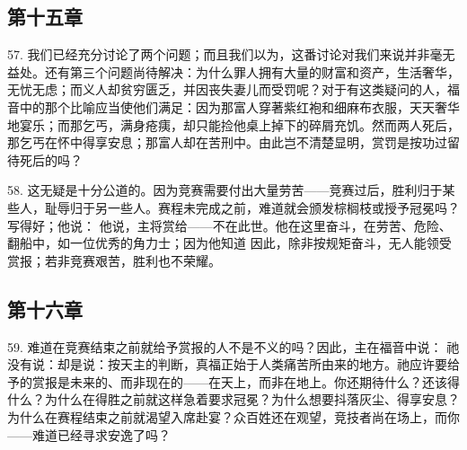 
\subsection{第十五章}

\par

57. 我们已经充分讨论了两个问题；而且我们以为，这番讨论对我们来说并非毫无益处。还有第三个问题尚待解决：为什么罪人拥有大量的财富和资产，生活奢华，无忧无虑；而义人却贫穷匮乏，并因丧失妻儿而受罚呢？对于有这类疑问的人，福音中的那个比喻应当使他们满足：因为那富人穿著紫红袍和细麻布衣服，天天奢华地宴乐；而那乞丐，满身疮痍，却只能捡他桌上掉下的碎屑充饥。然而两人死后，那乞丐在怀中得享安息；那富人却在苦刑中。由此岂不清楚显明，赏罚是按功过留待死后的吗？\par

58. 这无疑是十分公道的。因为竞赛需要付出大量劳苦——竞赛过后，胜利归于某些人，耻辱归于另一些人。赛程未完成之前，难道就会颁发棕榈枝或授予冠冕吗？写得好；他说： 他说，主将赏给——不在此世。他在这里奋斗，在劳苦、危险、翻船中，如一位优秀的角力士；因为他知道 因此，除非按规矩奋斗，无人能领受赏报；若非竞赛艰苦，胜利也不荣耀。\par


\subsection{第十六章}

\par

59. 难道在竞赛结束之前就给予赏报的人不是不义的吗？因此，主在福音中说： 祂没有说：却是说：按天主的判断，真福正始于人类痛苦所由来的地方。祂应许要给予的赏报是未来的、而非现在的——在天上，而非在地上。你还期待什么？还该得什么？为什么在得胜之前就这样急着要求冠冕？为什么想要抖落灰尘、得享安息？为什么在赛程结束之前就渴望入席赴宴？众百姓还在观望，竞技者尚在场上，而你——难道已经寻求安逸了吗？\par

